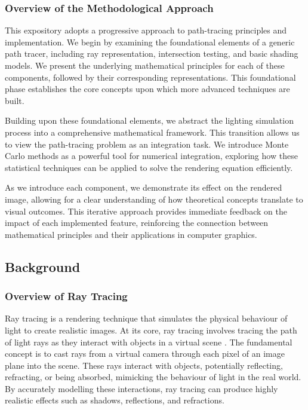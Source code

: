 \documentclass[12pt]{article}
\begin{document}
\subsubsection{Overview of the Methodological Approach}
This expository adopts a progressive approach to path-tracing principles and implementation.
We begin by examining the foundational elements of a generic path tracer, including ray representation, intersection testing, and basic shading models. We present the underlying mathematical principles for each of these components, followed by their corresponding representations. This foundational phase establishes the core concepts upon which more advanced techniques are built.

Building upon these foundational elements, we abstract the lighting simulation process into a comprehensive mathematical framework. This transition allows us to view the path-tracing problem as an integration task. We introduce Monte Carlo methods as a powerful tool for numerical integration, exploring how these statistical techniques can be applied to solve the rendering equation efficiently.

As we introduce each component, we demonstrate its effect on the rendered image, allowing for a clear understanding of how theoretical concepts translate to visual outcomes. This iterative approach provides immediate feedback on the impact of each implemented feature, reinforcing the connection between mathematical principles and their applications in computer graphics.

\subsection{Background}
\subsubsection{Overview of Ray Tracing}
Ray tracing is a rendering technique that simulates the physical behaviour of light to create realistic images. At its core, ray tracing involves tracing the path of light rays as they interact with objects in a virtual scene \cite{Glassner1989}.
The fundamental concept is to cast rays from a virtual camera through each pixel of an image plane into the scene. These rays interact with objects, potentially reflecting, refracting, or being absorbed, mimicking the behaviour of light in the real world. By accurately modelling these interactions, ray tracing can produce highly realistic effects such as shadows, reflections, and refractions.
\end{document}
